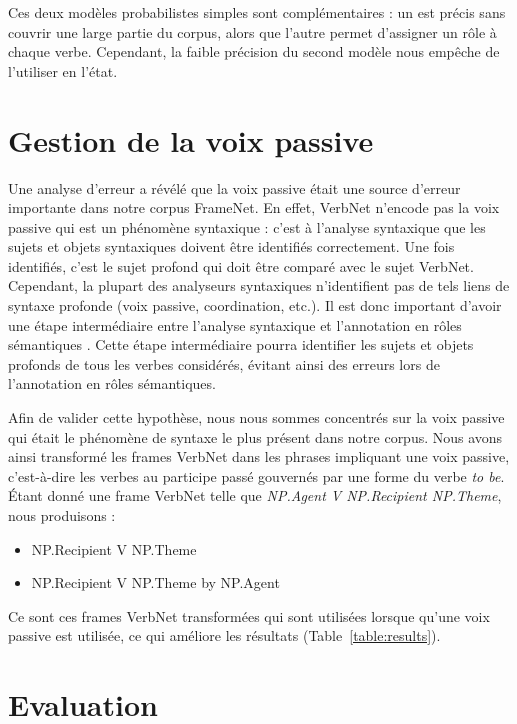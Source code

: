 Ces deux modèles probabilistes simples sont complémentaires : un est précis
sans couvrir une large partie du corpus, alors que l'autre permet d'assigner un
rôle à chaque verbe. Cependant, la faible précision du second modèle nous
empêche de l'utiliser en l'état. %

\section{Gestion de la voix passive}
\label{sec:passif}

Une analyse d'erreur a révélé que la voix passive était une source d'erreur
importante dans notre corpus FrameNet. En effet, VerbNet n'encode pas la voix
passive qui est un phénomène syntaxique : c'est à l'analyse syntaxique que les
sujets et objets syntaxiques doivent être identifiés correctement. Une fois
identifiés, c'est le sujet profond qui doit être comparé avec le sujet VerbNet.
Cependant, la plupart des analyseurs syntaxiques n'identifient pas de tels
liens de syntaxe profonde (voix passive, coordination, etc.). Il est donc
important d'avoir une étape intermédiaire entre l'analyse syntaxique et
l'annotation en rôles sémantiques \citep{bonfante2011modular,
ribeyre2013systeme}. Cette étape intermédiaire pourra identifier les sujets et
objets profonds de tous les verbes considérés, évitant ainsi des erreurs lors
de l'annotation en rôles sémantiques. 

Afin de valider cette hypothèse, nous nous sommes concentrés sur la voix
passive qui était le phénomène de syntaxe le plus présent dans notre corpus.
Nous avons ainsi transformé les frames VerbNet dans les phrases impliquant une
voix passive, c'est-à-dire les verbes au participe passé gouvernés par une
forme du verbe \emph{to be}. Étant donné une frame VerbNet telle que
\textit{NP.Agent V NP.Recipient NP.Theme}, nous produisons :

\begin{itemize}
    \item NP.Recipient V NP.Theme
    \item NP.Recipient V NP.Theme by NP.Agent
\end{itemize}

Ce sont ces frames VerbNet transformées qui sont utilisées lorsque qu'une voix
passive est utilisée, ce qui améliore les résultats (Table~\ref{table:results}).

\section{Evaluation}
\label{srl:evaluation}


